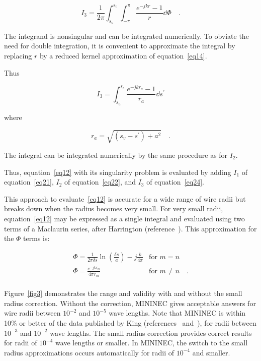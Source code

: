 \documentclass[12pt]{article}
\begin{document}
\begin{equation}
I_3 = \frac{1}{2\pi}\int_{s_u}^{s_v}\int_{-\pi}^\pi\frac{e^{-jkr}-1}{r}\dd{\Phi}
\quad.
\label{eq23}
\end{equation}

The integrand is nonsingular and can be integrated numerically. To
obviate the need for double integration, it is convenient to approximate
the integral by replacing $r$ by a reduced kernel approximation of
equation~\eqref{eq14}.

Thus

\begin{equation}
I_3 = \int_{s_u}^{s_v}\frac{e^{-jkr_a}-1}{r_a}\dd{s^\prime}
\label{eq24}
\end{equation}

where

\[
r_a = \sqrt{(s_v - s^\prime) + a^2}
\quad.
\]

The integral can be integrated numerically by the same procedure as for
$I_2$.

Thus, equation~\eqref{eq12} with its singularity problem is evaluated by
adding $I_1$ of equation~\eqref{eq21}, $I_2$ of equation~\eqref{eq22}, and
$I_3$ of equation~\eqref{eq24}.

This approach to evaluate~\eqref{eq12} is accurate for a wide range of
wire radii but breaks down when the radius becomes very small. For very
small radii, equation~\eqref{eq12} may be expressed as a single integral
and evaluated using two terms of a Maclaurin series, after Harrington
(reference~\cite{r5}). This approximation for the $\Phi$ terms is:

\begin{equation}
\begin{array}{ll}
\Phi = \frac{1}{2\pi\delta s}\ln\left(\frac{\delta s}{a}\right)
-j\frac{k}{4\pi}                   & \mbox{for } m=n          \\
\Phi = \frac{e^{-jkr_m}}{4\pi r_m} & \mbox{for } m\ne n \quad.\\
\end{array}
\label{eq25}
\end{equation}

Figure~\ref{fig3} demonstrates the range and validity with and without
the small radius correction. Without the correction, MININEC gives
acceptable answers for wire radii between $10^{-2}$ and $10^{-5}$ wave
lengths. Note that MININEC is within 10\% or better of the data
published by King (references~\cite{r8} and~\cite{r9}), for radii
between $10^{-3}$ and $10^{-2}$ wave lengths. The small radius
correction provides correct results for radii of $10^{-4}$ wave lengths
or smaller. In MININEC, the switch to the small radius approximations
occurs automatically for radii of $10^{-4}$ and smaller.
\end{document}
